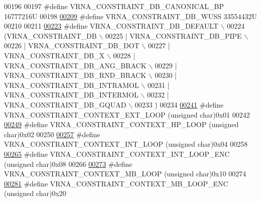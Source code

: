 \begin{DoxyCode}
00196 
00197 \textcolor{preprocessor}{#define VRNA\_CONSTRAINT\_DB\_CANONICAL\_BP         16777216U}
00198 
\hyperlink{group__hard__constraints_ga10ce6bd2355945f3c8161b7a30a2c322}{00209} \textcolor{preprocessor}{#define VRNA\_CONSTRAINT\_DB\_WUSS                 33554432U}
00210 
00211 
\hyperlink{group__hard__constraints_ga1c3864bdc92147a4d93de2b1b4356177}{00223} \textcolor{preprocessor}{#define VRNA\_CONSTRAINT\_DB\_DEFAULT \(\backslash\)}
00224 \textcolor{preprocessor}{  (VRNA\_CONSTRAINT\_DB \(\backslash\)}
00225 \textcolor{preprocessor}{   | VRNA\_CONSTRAINT\_DB\_PIPE \(\backslash\)}
00226 \textcolor{preprocessor}{   | VRNA\_CONSTRAINT\_DB\_DOT \(\backslash\)}
00227 \textcolor{preprocessor}{   | VRNA\_CONSTRAINT\_DB\_X \(\backslash\)}
00228 \textcolor{preprocessor}{   | VRNA\_CONSTRAINT\_DB\_ANG\_BRACK \(\backslash\)}
00229 \textcolor{preprocessor}{   | VRNA\_CONSTRAINT\_DB\_RND\_BRACK \(\backslash\)}
00230 \textcolor{preprocessor}{   | VRNA\_CONSTRAINT\_DB\_INTRAMOL \(\backslash\)}
00231 \textcolor{preprocessor}{   | VRNA\_CONSTRAINT\_DB\_INTERMOL \(\backslash\)}
00232 \textcolor{preprocessor}{   | VRNA\_CONSTRAINT\_DB\_GQUAD \(\backslash\)}
00233 \textcolor{preprocessor}{  )}
00234 
\hyperlink{group__hard__constraints_ga9418eda62a5dec070896702c279d2548}{00241} \textcolor{preprocessor}{#define VRNA\_CONSTRAINT\_CONTEXT\_EXT\_LOOP      (unsigned char)0x01}
00242 
\hyperlink{group__hard__constraints_ga79203702b197b6b9d3b78eed40663eb1}{00249} \textcolor{preprocessor}{#define VRNA\_CONSTRAINT\_CONTEXT\_HP\_LOOP       (unsigned char)0x02}
00250 
\hyperlink{group__hard__constraints_ga21feeab3a9e5fa5a9e3d9ac0fcf5994f}{00257} \textcolor{preprocessor}{#define VRNA\_CONSTRAINT\_CONTEXT\_INT\_LOOP      (unsigned char)0x04}
00258 
\hyperlink{group__hard__constraints_ga0536288e04ff6332ecdc23ca4705402b}{00265} \textcolor{preprocessor}{#define VRNA\_CONSTRAINT\_CONTEXT\_INT\_LOOP\_ENC  (unsigned char)0x08}
00266 
\hyperlink{group__hard__constraints_ga456ecd2ff00056bb64da8dd4f61bbfc5}{00273} \textcolor{preprocessor}{#define VRNA\_CONSTRAINT\_CONTEXT\_MB\_LOOP       (unsigned char)0x10}
00274 
\hyperlink{group__hard__constraints_ga02a3d703ddbcfce393e4bbfcb9db7077}{00281} \textcolor{preprocessor}{#define VRNA\_CONSTRAINT\_CONTEXT\_MB\_LOOP\_ENC   (unsigned char)0x20}

\end{DoxyCode}
